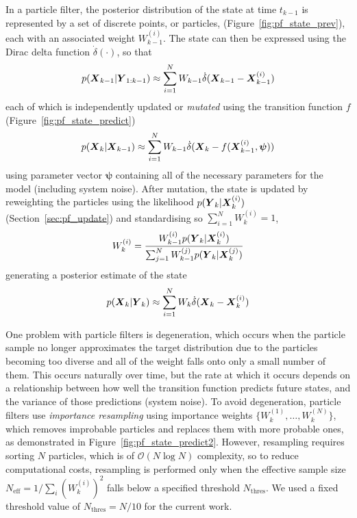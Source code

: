 In a particle filter, the posterior distribution of the state at time $t_{k-1}$
is represented by a set of discrete points, or particles, (Figure~\ref{fig:pf_state_prev}),
each with an associated weight $W_{k-1}^{(i)}$.
The state can then be expressed using the Dirac delta function $\dot\delta(\cdot)$,
so that
\begin{equation*}
p(\mbox{$\boldsymbol{X}$}_{k-1} | \mbox{$\boldsymbol{Y}$}_{1:k-1}) \approx 
    \sum_{i=1}^N W_{k-1} \dot\delta(\mbox{$\boldsymbol{X}$}_{k-1} - \mbox{$\boldsymbol{X}$}_{k-1}^{(i)})
\end{equation*}
each of which is independently updated or \emph{mutated} using the transition function $f$ (Figure~\ref{fig:pf_state_predict})
\begin{equation*}
p(\mbox{$\boldsymbol{X}$}_k | \mbox{$\boldsymbol{X}$}_{k-1}) \approx 
    \sum_{i=1}^N W_{k-1} \dot\delta(\mbox{$\boldsymbol{X}$}_{k} - f(\mbox{$\boldsymbol{X}$}_{k-1}^{(i)}, \boldsymbol{\psi}))
\end{equation*}
using parameter vector $\boldsymbol{\psi}$ containing all of the necessary parameters
for the model (including system noise).
After mutation, 
the state is updated by reweighting the particles using the likelihood $p(\mbox{$\boldsymbol{Y}$}_k | \mbox{$\boldsymbol{X}$}_k^{(i)})$ 
(Section~\ref{sec:pf_update}) and standardising so $\sum_{i=1}^N W_k^{(i)} = 1$,
\begin{equation*}
W_k^{(i)} = \frac{W_{k-1}^{(i)} p(\mbox{$\boldsymbol{Y}$}_k | \mbox{$\boldsymbol{X}$}_k^{(i)})}{
    \sum_{j=1}^N W_{k-1}^{(j)} p(\mbox{$\boldsymbol{Y}$}_k | \mbox{$\boldsymbol{X}$}_k^{(j)})
}
\end{equation*}
generating a posterior estimate of the state
\begin{equation*}
p(\mbox{$\boldsymbol{X}$}_k | \mbox{$\boldsymbol{Y}$}_k) \approx  
    \sum_{i=1}^N W_{k} \dot\delta(\mbox{$\boldsymbol{X}$}_{k} - \mbox{$\boldsymbol{X}$}_{k}^{(i)})
\end{equation*}

One problem with particle filters is degeneration,
which occurs when the particle sample no longer approximates the target distribution
due to the particles becoming too diverse
and all of the weight falls onto only a small number of them.
This occurs naturally over time, but the rate at which it occurs depends 
on a relationship between how well the transition function predicts future states,
and the variance of those predictions (system noise).
To avoid degeneration,
particle filters use \emph{importance resampling}
using importance weights $\{W_k^{(1)}, \ldots, W_k^{(N)}\}$,
which removes improbable particles and replaces them with more probable ones,
as demonstrated in Figure~\ref{fig:pf_state_predict2}.
However, resampling requires sorting $N$ particles,
which is of $\mathcal{O}(N\log N)$ complexity,
so to reduce computational costs, resampling is performed only when
the effective sample size $N_{\text{eff}} = 1 / \sum_i (W_k^{(i)})^2$
falls below a specified threshold $N_{\text{thres}}$.
We used a fixed threshold value of $N_{\text{thres}} = N/10$
for the current work.

